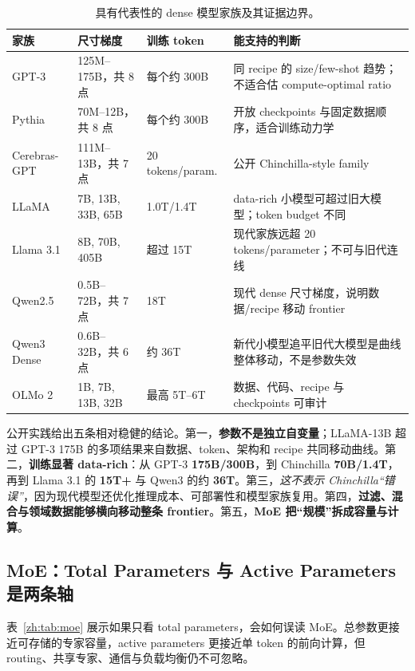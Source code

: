 \documentclass[UTF8,10pt,a4paper,fontset=none]{ctexart}
\begin{document}
\begin{table}[htbp]
\centering
\small
\caption{具有代表性的 dense 模型家族及其证据边界。}
\label{zh:tab:dense-families}
\begin{tabularx}{\textwidth}{p{2.2cm}p{3.9cm}p{2.5cm}Y}
\toprule
家族 & 尺寸梯度 & 训练 token & 能支持的判断 \\
\midrule
GPT-3 & 125M--175B，共 8 点 & 每个约 300B & 同 recipe 的 size/few-shot 趋势；不适合估 compute-optimal ratio\cite{zh:brown2020} \\
Pythia & 70M--12B，共 8 点 & 每个约 300B & 开放 checkpoints 与固定数据顺序，适合训练动力学\cite{zh:biderman2023} \\
Cerebras-GPT & 111M--13B，共 7 点 & 20 tokens/param. & 公开 Chinchilla-style family\cite{zh:cerebrasgpt2023} \\
LLaMA & 7B, 13B, 33B, 65B & 1.0T/1.4T & data-rich 小模型可超过旧大模型；token budget 不同\cite{zh:llama2023} \\
Llama 3.1 & 8B, 70B, 405B & 超过 15T & 现代家族远超 20 tokens/parameter；不可与旧代连线\cite{zh:llama31} \\
Qwen2.5 & 0.5B--72B，共 7 点 & 18T & 现代 dense 尺寸梯度，说明数据/recipe 移动 frontier\cite{zh:qwen25} \\
Qwen3 Dense & 0.6B--32B，共 6 点 & 约 36T & 新代小模型追平旧代大模型是曲线整体移动，不是参数失效\cite{zh:qwen3} \\
OLMo 2 & 1B, 7B, 13B, 32B & 最高 5T--6T & 数据、代码、recipe 与 checkpoints 可审计\cite{zh:olmo2} \\
\bottomrule
\end{tabularx}
\end{table}

公开实践给出五条相对稳健的结论。第一，\textbf{参数不是独立自变量}；LLaMA-13B 超过 GPT-3 175B 的多项结果来自数据、token、架构和 recipe 共同移动曲线。第二，\textbf{训练显著 data-rich}：从 GPT-3 \textbf{175B/300B}，到 Chinchilla \textbf{70B/1.4T}，再到 Llama 3.1 的 \textbf{15T+} 与 Qwen3 的约 \textbf{36T}。第三，\textit{这不表示 Chinchilla“错误”}，因为现代模型还优化推理成本、可部署性和模型家族复用。第四，\textbf{过滤、混合与领域数据能够横向移动整条 frontier}。第五，\textbf{MoE 把“规模”拆成容量与计算}。

\subsection{MoE：Total Parameters 与 Active Parameters 是两条轴}

表~\ref{zh:tab:moe} 展示如果只看 total parameters，会如何误读 MoE。总参数更接近可存储的专家容量，active parameters 更接近单 token 的前向计算，但 routing、共享专家、通信与负载均衡仍不可忽略。
\end{document}
